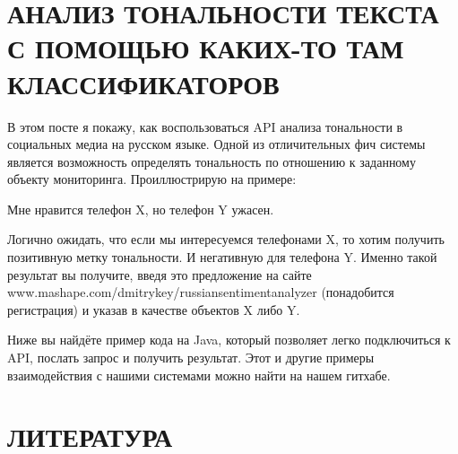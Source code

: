 

 

 
\section*{АНАЛИЗ ТОНАЛЬНОСТИ ТЕКСТА С ПОМОЩЬЮ КАКИХ-ТО ТАМ КЛАССИФИКАТОРОВ}

В этом посте я покажу, как воспользоваться API анализа тональности в социальных медиа на русском языке. Одной из отличительных фич системы является возможность определять тональность по отношению к заданному объекту мониторинга. Проиллюстрирую на примере:

Мне нравится телефон X, но телефон Y ужасен\cite{cfl}.

Логично ожидать, что если мы интересуемся телефонами X, то хотим получить позитивную метку тональности. И негативную для телефона Y. Именно такой результат вы получите, введя это предложение на сайте www.mashape.com/dmitrykey/russiansentimentanalyzer (понадобится регистрация) и указав в качестве объектов X либо Y.

Ниже вы найдёте пример кода на Java, который позволяет легко подключиться к API, послать запрос и получить результат. Этот и другие примеры взаимодействия с нашими системами можно найти на нашем гитхабе.

\section*{ЛИТЕРАТУРА}



